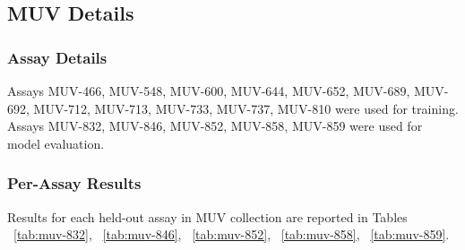 \documentclass[journal=jacsat,manuscript=article]{achemso}
\begin{document}
\subsection{MUV Details}
\subsubsection{Assay Details}
Assays MUV-466, MUV-548, MUV-600, MUV-644, MUV-652, MUV-689, MUV-692, MUV-712, MUV-713, MUV-733, MUV-737, MUV-810 were used for training. Assays MUV-832, MUV-846, MUV-852,  MUV-858, MUV-859 were used for model evaluation.
\subsubsection{Per-Assay Results}
Results for each held-out assay in MUV collection are reported in Tables ~\ref{tab:muv-832}, ~\ref{tab:muv-846}, ~\ref{tab:muv-852}, ~\ref{tab:muv-858}, ~\ref{tab:muv-859}.
\end{document}
